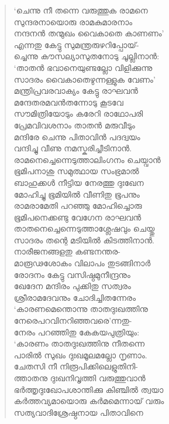 \begin{verse}
‘ചെന്നു നീ തന്നെ വരുത്തുക രാമനെ\\
സുന്ദരനായൊരു രാമകുമാരനാം\\
നന്ദനന്‍ തന്മുഖം വൈകാതെ കാണണം’\\
എന്നതു കേട്ടു സുമന്ത്രരുഴറിപ്പോയ്-\\
ച്ചെന്നു കൗസല്യാസുതനോടു ചൂല്ലിനാന്‍:\\
‘താതന്‍ ഭവാനെയുണ്ടല്ലോ വിളിക്കുന്നു\\
സാദരം വൈകാതെഴുന്നള്ളുക വേണം’\\
മന്ത്രിപ്രവരവാക്യം കേട്ടു രാഘവന്‍\\
മന്ദേതരമവന്‍തന്നോടു കൂടവേ\\
സൗമിത്രിയോടും കരേറി രാഥോപരി\\
പ്രേമവിവശനാം താതന്‍ മരുവീടും\\
മന്ദിരേ ചെന്നു പിതാവിന്‍ പദദ്വയം\\
വന്ദിച്ചു വീണു നമസ്കരിച്ചീടിനാന്‍.\\
രാമനെച്ചെന്നെടുത്താലിംഗനം ചെയ്വാന്‍\\
ഭൂമിപനാശു സമുത്ഥായ സംഭ്രമാല്‍\\
ബാഹുക്കള്‍ നീട്ടിയ നേരത്തു ദുഃഖേന\\
മോഹിച്ചു ഭൂമിയില്‍ വീണിതു ഭൂപനും\\
രാമരാമേതി പറഞ്ഞു മോഹിച്ചൊരു\\
ഭൂമിപനെക്കണ്ടു വേഗേന രാഘവന്‍\\
താതനെച്ചെന്നെടുത്താശ്ലേഷവും ചെയ്തു\\
സാദരം തന്റെ മടിയില്‍ കിടത്തിനാന്‍.\\
നാരീജനങ്ങളതു കണ്ടനന്തര-\\
മാരൂഢശോകം വിലാപം തുടങ്ങിനാര്‍\\
രോദനം കേട്ടു വസിഷ്ഠമുനീന്ദ്രനും\\
ഖേദേന മന്ദിരം പുക്കിതു സത്വരം\\
ശ്രീരാമദേവനും ചോദിച്ചിതന്നേരം\\
‘കാരണമെന്തൊന്നു താതദുഃഖത്തിനു\\
നേരെപറവിനറിഞ്ഞവരെ’ന്നതു-\\
നേരം പറഞ്ഞിതു കേകയപുത്രിയും:\\
‘കാരണം താതദുഃഖത്തിനു നീതന്നെ\\
പാരില്‍ സുഖം ദുഃഖമൂലമല്ലോ നൃണാം.\\
ചേതസി നീ നിരൂപിക്കിലെളുതിനി-\\
ത്താതനു ദുഃഖനിവൃത്തി വരുത്തുവാന്‍\\
ഭര്‍ത്തൃദുഃഖോപശാന്തിക്കു കിഞ്ചില്‍ ത്വയാ\\
കര്‍ത്തവ്യമായൊരു കര്‍മമെന്നായ് വരും\\
സത്യവാദിശ്രേഷ്ഠനായ പിതാവിനെ\\

\end{verse}

